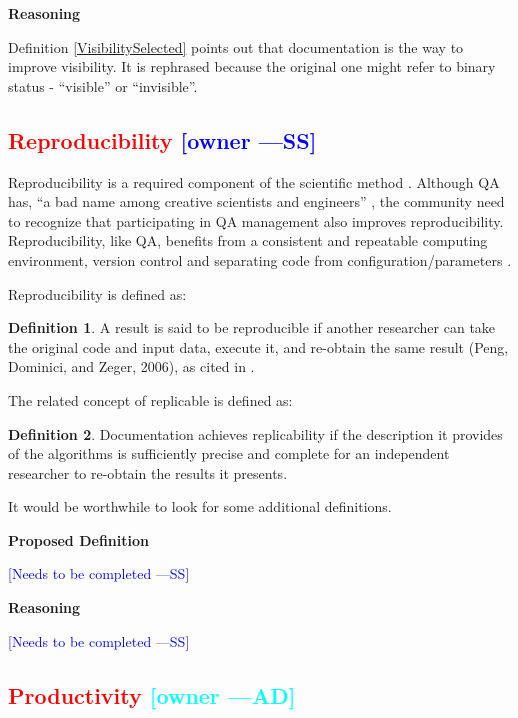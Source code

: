 \documentclass[letterpaper,cleveref]{lipics-v2019}
\newcommand{\authornote}[3]{\textcolor{#1}{[#3 ---#2]}}
\newcommand{\authornote}[3]{}
\newcommand{\wss}[1]{\authornote{blue}{SS}{#1}} %
\newcommand{\ad}[1]{\authornote{cyan}{AD}{#1}} %
\newcommand{\notdone}[1]{\textcolor{red}{#1}}
\theoremstyle{definition}
\newtheorem{defn}{Definition}
\begin{document}
\noindent \textbf{Reasoning}

Definition \ref{VisibilitySelected} points out that documentation is the way to
improve visibility. It is rephrased because the original one might refer to
binary status - ``visible'' or ``invisible''.

\subsection{\notdone{Reproducibility} \wss{owner}}

Reproducibility is a required component of the scientific method
\citep{Davison2012}.  Although QA has, ``a bad name among creative scientists
and engineers'' \citep[p.~352]{Roache1998}, the community need to recognize that
participating in QA management also improves reproducibility.  Reproducibility,
like QA, benefits from a consistent and repeatable computing environment,
version control and separating code from configuration/parameters
\citep{Davison2012}.

Reproducibility is defined as:

\begin{defn}
  A result is said to be reproducible if another researcher can take the
  original code and input data, execute it, and re-obtain the same result (Peng,
  Dominici, and Zeger, 2006), as cited in \citet{BenureauAndRougier2017}.
\end{defn}

The related concept of replicable is defined as:

\begin{defn}
  Documentation achieves replicability if the description it provides of the
  algorithms is sufficiently precise and complete for an independent researcher
  to re-obtain the results it presents.  \citep{BenureauAndRougier2017}
\end{defn}

It would be worthwhile to look for some additional definitions.

\noindent \textbf{Proposed Definition} 

\wss{Needs to be completed}

\noindent \textbf{Reasoning}

\wss{Needs to be completed}

\subsection{\notdone{Productivity} \ad{owner}}
\end{document}
